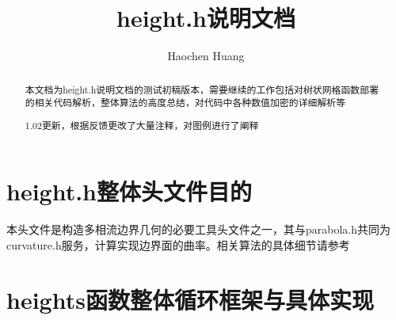 \documentclass[lang=cn,11pt,a4paper]{elegantpaper}
\title{height.h说明文档}
\author{Haochen Huang}
\date{\zhtoday}
\begin{document}
\maketitle
\begin{abstract}
    本文档为height.h说明文档的测试初稿版本，需要继续的工作包括对树状网格函数部署的相关代码解析，整体算法的高度总结，对代码中各种数值加密的详细解析等\par
    1.02更新，根据反馈更改了大量注释，对图例进行了阐释
\end{abstract}

\tableofcontents

\section{height.h整体头文件目的}
本头文件是构造多相流边界几何的必要工具头文件之一，其与parabola.h共同为curvature.h服务，计算实现边界面的曲率。相关算法的具体细节请参考\cite{popinet2009accurate}

\section{heights函数整体循环框架与具体实现}
\end{document}
